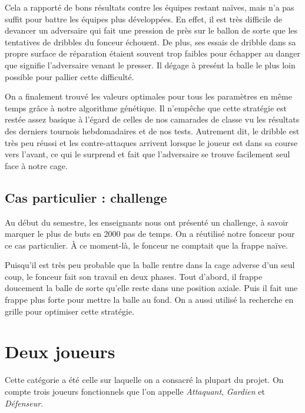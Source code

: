 \documentclass[12pt,a4paper]{article}
\begin{document}
Cela a rapport\'e de bons r\'esultats contre les \'equipes restant 
na\"ives, mais n'a pas suffit pour battre les \'equipes plus d\'evelopp\'ees. 
En effet, il est tr\`es difficile de devancer un adversaire qui fait une 
pression de pr\`es sur le ballon de sorte que les tentatives de 
dribbles du fonceur \'echouent.
De plus, ses essais de dribble dans sa propre surface de r\'eparation 
\'etaient souvent trop faibles pour \'echapper au danger que signifie 
l'adversaire venant le presser. Il d\'egage \`a pres\'ent la balle le plus loin 
possible pour pallier cette difficult\'e.

On a finalement trouv\'e les valeurs optimales pour tous les param\`etres en 
m\^eme temps gr\^ace \`a notre algorithme g\'en\'etique.
Il n'emp\^eche que cette strat\'egie est rest\'ee assez basique \`a l'\'egard 
de celles de nos camarades de classe vu les r\'esultats des derniers tournois 
hebdomadaires et de nos tests. 
Autrement dit, le dribble est tr\`es peu r\'eussi et les contre-attaques 
arrivent lorsque le joueur est dans sa course vers l'avant, ce qui le surprend 
et fait que l'adversaire se trouve facilement seul face \`a notre cage.

\subsection*{Cas particulier : challenge}
Au d\'ebut du semestre, les enseignants nous ont pr\'esent\'e un challenge, \`a 
savoir marquer le plus de buts en 2000 pas de temps. On a r\'eutilis\'e notre 
fonceur pour ce cas particulier. \`A ce moment-l\`a, le fonceur ne comptait que 
la frappe na\"ive. 

Puisqu'il est tr\`es peu probable que la balle rentre dans 
la cage adverse d'un seul coup, le fonceur fait son travail en deux phases. 
Tout d'abord, il frappe doucement la balle de sorte qu'elle reste dans une 
position axiale. Puis il fait une frappe plus forte pour mettre la balle au 
fond. On a aussi utilis\'e la recherche en grille pour optimiser cette 
strat\'egie. 

\section{Deux joueurs}
Cette cat\'egorie a \'et\'e celle sur laquelle on a consacr\'e la plupart du 
projet. On compte trois joueurs fonctionnels que l'on appelle 
{\itshape Attaquant}, {\itshape Gardien} et {\itshape D\'efenseur}. 
\end{document}
